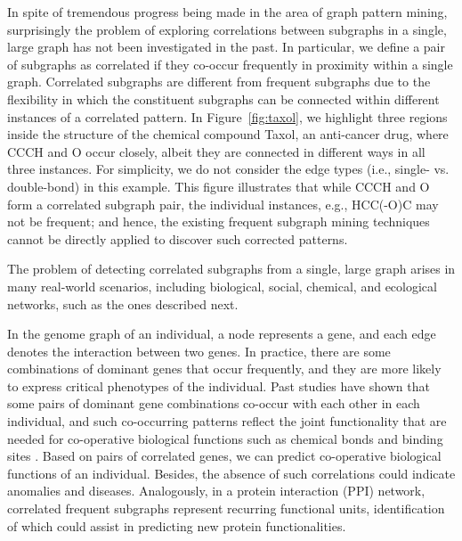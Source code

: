 In spite of tremendous progress being made in the area of graph pattern mining, surprisingly the problem of exploring correlations between subgraphs
in a single, large graph has not been investigated in the past. In particular, we define a pair of subgraphs as correlated if
they co-occur frequently in proximity within a single graph. Correlated subgraphs are different from frequent subgraphs due to
the flexibility in which the constituent subgraphs can be connected within different instances of a correlated pattern. In Figure~\ref{fig:taxol},
we highlight three regions inside the structure of the chemical compound {\sf Taxol}, an anti-cancer drug, where {\sf CCCH} and {\sf O} occur closely,
albeit they are connected in different ways in all three instances. For simplicity, we do not consider the edge types (i.e., single- vs. double-bond)
in this example. This figure illustrates that while {\sf CCCH} and {\sf O} form a correlated subgraph pair, the individual instances, e.g., {\sf HCC(-O)C}
may not be frequent; and hence, the existing frequent subgraph mining techniques cannot be directly applied to discover such corrected patterns.


The problem of detecting correlated subgraphs from a single, large graph arises in many real-world scenarios, including biological,
social, chemical, and ecological networks, such as the ones described next.


 In the genome graph of an individual, a node represents a gene,
and each edge denotes the interaction between two genes. In practice, there are some combinations of dominant genes that
occur frequently, and they are more likely to express critical phenotypes of the individual.
Past studies have shown that some pairs of dominant gene combinations co-occur with each other in each individual,
and such co-occurring patterns reflect the joint functionality that are needed for co-operative biological functions such as chemical bonds
and binding sites \cite{LFSW14}. Based on pairs of correlated genes, we can predict co-operative biological functions of an
individual. Besides, the absence of such correlations could indicate anomalies and diseases.
Analogously, in a protein interaction (PPI) network, correlated frequent subgraphs represent recurring functional units,
identification of which could assist in predicting new protein functionalities.

